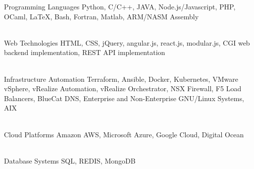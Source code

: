 


\begin{cvskills}


\cvskill
{Programming Languages} %
{Python, C/C++, JAVA, Node.js/Javascript, PHP, OCaml, \LaTeX, Bash, Fortran, Matlab, \newline ARM/NASM Assembly} %

\\


\cvskill
{Web Technologies} %
{HTML, CSS, jQuery, angular.js, react.js, modular.js, CGI web backend implementation, \newline REST API implementation} %

\\


\cvskill
{Infrastructure Automation} %
{Terraform, Ansible, Docker, Kubernetes, VMware vSphere, vRealize Automation, \newline vRealize Orchestrator, NSX Firewall, F5 Load Balancers, BlueCat DNS, \newline Enterprise and Non-Enterprise GNU/Linux Systems, AIX} %

\\


\cvskill
{Cloud Platforms} %
{Amazon AWS, Microsoft Azure, Google Cloud, Digital Ocean} %

\\


\cvskill
{Database Systems} %
{SQL, REDIS, MongoDB} %


\end{cvskills}
